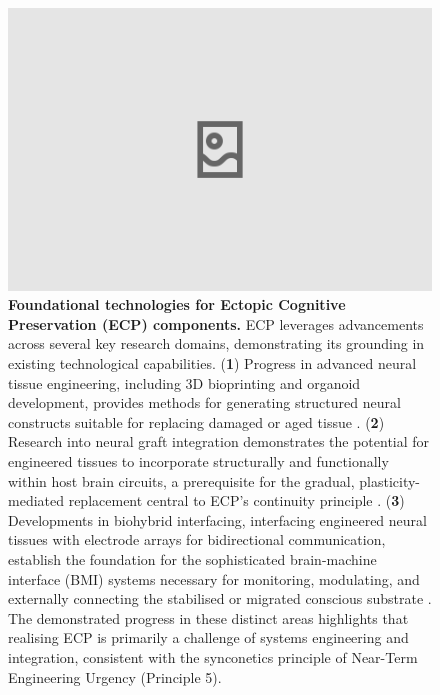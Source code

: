 \documentclass[10pt]{article}
\begin{document}
\begin{sloppypar}
  \begin{figure}[ht]
    \centering
    \includegraphics[width=\textwidth]{figures/ecp-near-term-technologies.png}
    \caption[ECP: Foundational technologies for Ectopic Cognitive Preservation components]{\textbf{Foundational technologies for Ectopic Cognitive Preservation (ECP) components.} ECP leverages advancements across several key research domains, demonstrating its grounding in existing technological capabilities. (\textbf{1}) Progress in advanced neural tissue engineering, including 3D bioprinting and organoid development, provides methods for generating structured neural constructs suitable for replacing damaged or aged tissue \citep{jin_integration_2023}. (\textbf{2}) Research into neural graft integration demonstrates the potential for engineered tissues to incorporate structurally and functionally within host brain circuits, a prerequisite for the gradual, plasticity-mediated replacement central to ECP’s continuity principle \citep{hebert_lab_research_2025,hebert_could_2022}. (\textbf{3}) Developments in biohybrid interfacing, interfacing engineered neural tissues with electrode arrays for bidirectional communication, establish the foundation for the sophisticated brain-machine interface (BMI) systems necessary for monitoring, modulating, and externally connecting the stabilised or migrated conscious substrate \citep{jordan_open_2024,vrselja_restoration_2019}. The demonstrated progress in these distinct areas highlights that realising ECP is primarily a challenge of systems engineering and integration, consistent with the synconetics principle of Near-Term Engineering Urgency (Principle 5).}
    \label{fig:ecp-near-term-technologies}
  \end{figure}


\end{sloppypar}
\end{document}
